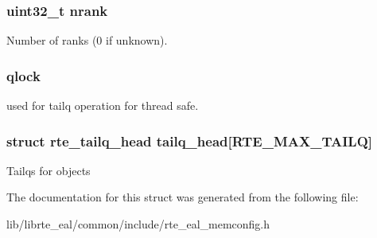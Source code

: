 \subsubsection[{nrank}]{\setlength{\rightskip}{0pt plus 5cm}uint32\+\_\+t nrank}\label{structrte__mem__config_a59a112650302067fe308c24133e44d7e}
Number of ranks (0 if unknown). \hypertarget{structrte__mem__config_a7467e2dc92b59ca2fdfc24a43615c6ee}{}
\subsubsection[{qlock}]{ qlock}\label{structrte__mem__config_a7467e2dc92b59ca2fdfc24a43615c6ee}
used for tailq operation for thread safe. \hypertarget{structrte__mem__config_a63f874fec11e96c59fefda7e24b7c681}{}
\subsubsection[{tailq\+\_\+head}]{\setlength{\rightskip}{0pt plus 5cm}struct {\bf rte\+\_\+tailq\+\_\+head} tailq\+\_\+head\mbox{[}R\+T\+E\+\_\+\+M\+A\+X\+\_\+\+T\+A\+I\+L\+Q\mbox{]}}\label{structrte__mem__config_a63f874fec11e96c59fefda7e24b7c681}
Tailqs for objects 

The documentation for this struct was generated from the following file\+:\begin{DoxyCompactItemize}
\item 
lib/librte\+\_\+eal/common/include/rte\+\_\+eal\+\_\+memconfig.\+h\end{DoxyCompactItemize}
